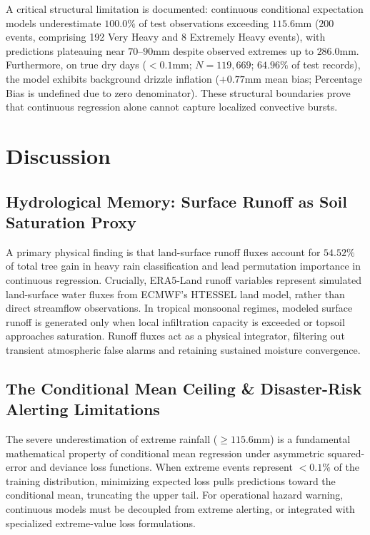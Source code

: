 \documentclass[pdflatex,sn-mathphys,Numbered]{sn-jnl}
\begin{document}
A critical structural limitation is documented: continuous conditional expectation models underestimate $100.0\%$ of test observations exceeding $115.6$\;mm ($200$ events, comprising 192 Very Heavy and 8 Extremely Heavy events), with predictions plateauing near $70$--$90$\;mm despite observed extremes up to $286.0$\;mm. Furthermore, on true dry days ($<0.1$\;mm; $N = 119,669$; $64.96\%$ of test records), the model exhibits background drizzle inflation ($+0.77$\;mm mean bias; Percentage Bias is undefined due to zero denominator). These structural boundaries prove that continuous regression alone cannot capture localized convective bursts.

\section{Discussion}\label{sec5}

\subsection{Hydrological Memory: Surface Runoff as Soil Saturation Proxy}
A primary physical finding is that land-surface runoff fluxes account for $54.52\%$ of total tree gain in heavy rain classification and lead permutation importance in continuous regression. Crucially, ERA5-Land runoff variables represent simulated land-surface water fluxes from ECMWF's HTESSEL land model, rather than direct streamflow observations. In tropical monsoonal regimes, modeled surface runoff is generated only when local infiltration capacity is exceeded or topsoil approaches saturation. Runoff fluxes act as a physical integrator, filtering out transient atmospheric false alarms and retaining sustained moisture convergence.

\subsection{The Conditional Mean Ceiling \& Disaster-Risk Alerting Limitations}
The severe underestimation of extreme rainfall ($\ge 115.6$\;mm) is a fundamental mathematical property of conditional mean regression under asymmetric squared-error and deviance loss functions. When extreme events represent $<0.1\%$ of the training distribution, minimizing expected loss pulls predictions toward the conditional mean, truncating the upper tail. For operational hazard warning, continuous models must be decoupled from extreme alerting, or integrated with specialized extreme-value loss formulations.
\end{document}
